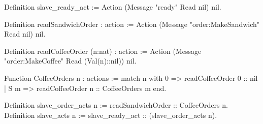 Definition slave_ready_act := Action (Message "ready" Read nil) nil.

Definition readSandwichOrder : action := 
  Action (Message "order:MakeSandwich" Read nil) nil.

Definition readCoffeeOrder (n:nat) : action := 
  Action (Message "order:MakeCoffee" Read (Val(n)::nil)) nil.

Function CoffeeOrders n : actions :=
  match n with
    0   => readCoffeeOrder 0 :: nil
  | S m => readCoffeeOrder n :: CoffeeOrders m
  end.

Definition slave_order_acts n := readSandwichOrder :: CoffeeOrders n.
Definition slave_acts n := slave_ready_act :: (slave_order_acts n).